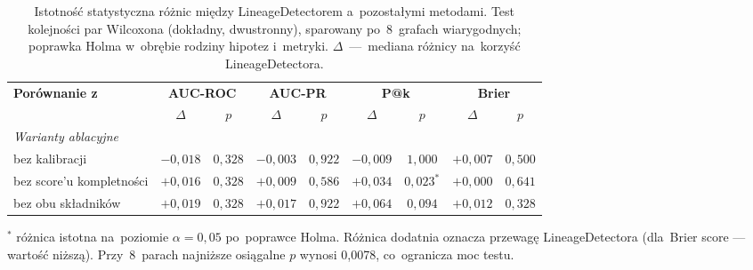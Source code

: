 \begin{table}[ht]
\centering
\caption{Istotność statystyczna różnic między LineageDetectorem a~pozostałymi metodami. Test kolejności par Wilcoxona (dokładny, dwustronny), sparowany po~8~grafach wiarygodnych; poprawka Holma w~obrębie rodziny hipotez i~metryki. $\Delta$~—~mediana różnicy na~korzyść LineageDetectora.}
\label{tab:istotnosc}
\small
\begin{tabular}{lcccccccc}
\toprule
\textbf{Porównanie z} & \multicolumn{2}{c}{\textbf{AUC-ROC}} & \multicolumn{2}{c}{\textbf{AUC-PR}} & \multicolumn{2}{c}{\textbf{P@k}} & \multicolumn{2}{c}{\textbf{Brier}} \\
\cmidrule(lr){2-3} \cmidrule(lr){4-5} \cmidrule(lr){6-7} \cmidrule(lr){8-9}
 & $\Delta$ & $p$ & $\Delta$ & $p$ & $\Delta$ & $p$ & $\Delta$ & $p$ \\
\midrule
\multicolumn{9}{l}{\emph{Warianty ablacyjne}} \\
bez kalibracji & $-0{,}018$ & $0{,}328$ & $-0{,}003$ & $0{,}922$ & $-0{,}009$ & $1{,}000$ & $+0{,}007$ & $0{,}500$ \\
bez score'u kompletności & $+0{,}016$ & $0{,}328$ & $+0{,}009$ & $0{,}586$ & $+0{,}034$ & $0{,}023^{*}$ & $+0{,}000$ & $0{,}641$ \\
bez obu składników & $+0{,}019$ & $0{,}328$ & $+0{,}017$ & $0{,}922$ & $+0{,}064$ & $0{,}094$ & $+0{,}012$ & $0{,}328$ \\
\bottomrule
\end{tabular}

\vspace{0.5em}
\footnotesize $^{*}$ różnica istotna na~poziomie $\alpha = 0{,}05$ po~poprawce Holma. Różnica dodatnia oznacza przewagę LineageDetectora (dla~Brier score — wartość niższą). Przy~8~parach najniższe osiągalne $p$ wynosi 0{,}0078, co~ogranicza moc testu.
\end{table}